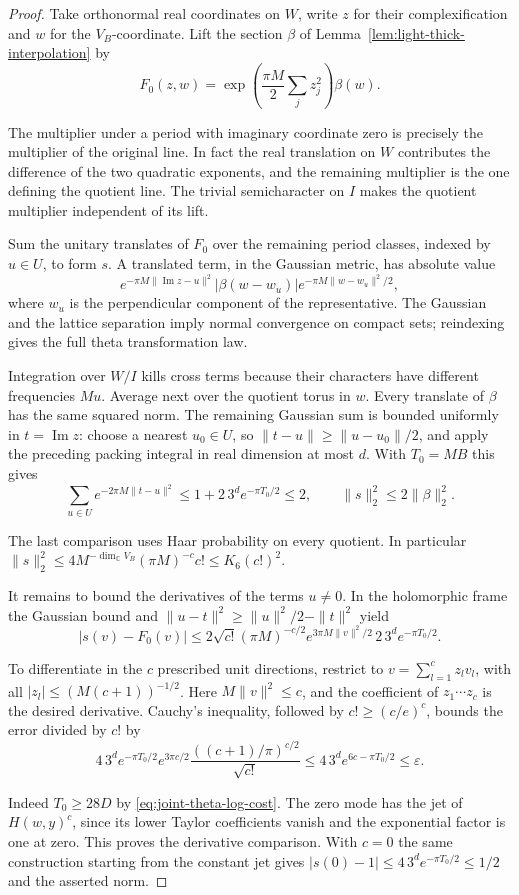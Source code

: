 \begin{proof}
Take orthonormal real coordinates on \(W\), write \(z\) for their
complexification and \(w\) for the \(V_B\)-coordinate. Lift the
section \(\beta\) of Lemma~\ref{lem:light-thick-interpolation} by
\[
 F_0(z,w)=\exp\!\left(\frac{\pi M}{2}\sum_j z_j^2\right)\beta(w).
\]

The multiplier under a period with imaginary coordinate zero is
precisely the multiplier of the original line. In fact the real
translation on \(W\) contributes the difference of the two
quadratic exponents, and the remaining multiplier is the one
defining the quotient line. The trivial semicharacter on \(I\)
makes the quotient multiplier independent of its lift.

Sum the unitary translates of \(F_0\) over the remaining period
classes, indexed by \(u\in U\), to form \(s\).
A translated term, in the Gaussian metric, has absolute value
\[
 e^{-\pi M\|\operatorname{Im}z-u\|^2}
       |\beta(w-w_u)|e^{-\pi M\|w-w_u\|^2/2},
\]
where \(w_u\) is the perpendicular component of the representative.
The Gaussian and the lattice separation imply normal convergence
on compact sets; reindexing gives the full theta transformation law.

Integration over \(W/I\) kills cross terms because their characters
have different frequencies \(M u\). Average next over the quotient
torus in \(w\). Every translate of \(\beta\) has the same squared
norm. The remaining Gaussian sum is bounded uniformly in
\(t=\operatorname{Im} z\): choose a nearest \(u_0\in U\), so
\(\|t-u\|\ge\|u-u_0\|/2\), and apply the preceding packing integral
in real dimension at most \(d\). With \(T_0=MB\) this gives
\[
 \sum_{u\in U}e^{-2\pi M\|t-u\|^2}
 \le1+2\,3^d e^{-\pi T_0/2}\le 2,\qquad
 \|s\|_2^2\le 2\|\beta\|_2^2 .
\]

The last comparison uses Haar probability on every quotient.
In particular \(\|s\|_2^2\le4M^{-\dim_{\mathbb C}V_B}
(\pi M)^{-c}c!\le K_6(c!)^2\).

It remains to bound the derivatives of the terms \(u\ne0\).
In the holomorphic frame the Gaussian bound and
\(\|u-t\|^2\ge\|u\|^2/2-\|t\|^2\) yield
\[
 |s(v)-F_0(v)|\le
 2\sqrt{c!}(\pi M)^{-c/2}
 e^{3\pi M\|v\|^2/2}\,2\,3^d e^{-\pi T_0/2}.
\]

To differentiate in the \(c\) prescribed unit directions, restrict
to \(v=\sum_{l=1}^c z_lv_l\), with all \(|z_l|\le(M(c+1))^{-1/2}\).
Here \(M\|v\|^2\le c\), and the coefficient of
\(z_1\cdots z_c\) is the desired derivative. Cauchy's inequality,
followed by \(c!\ge(c/e)^c\), bounds the error divided by \(c!\) by
\[
 4\,3^d e^{-\pi T_0/2}
 e^{3\pi c/2}\frac{((c+1)/\pi)^{c/2}}{\sqrt{c!}}
 \le 4\,3^d e^{6c-\pi T_0/2}\le\varepsilon .
\]

Indeed \(T_0\ge28D\) by \eqref{eq:joint-theta-log-cost}.
The zero mode has the jet of \(H(w,y)^c\), since its lower
Taylor coefficients vanish and the exponential factor is one
at zero. This proves the derivative comparison. With \(c=0\)
the same construction starting from the constant jet gives
\(|s(0)-1|\le4\,3^de^{-\pi T_0/2}\le1/2\) and the asserted norm.
\end{proof}

